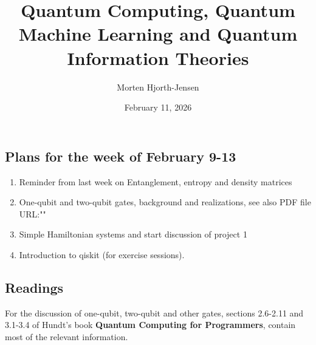 \documentclass[%
oneside,                 %
final,                   %
10pt]{article}
\begin{document}

\newcommand{\exercisesection}[1]{\subsection*{#1}}






\title{Quantum Computing, Quantum Machine Learning and Quantum Information Theories}


\author{Morten Hjorth-Jensen}

\date{February 11, 2026
}

\subsection{Plans for the week of February 9-13}

\begin{enumerate}
\item Reminder from last week on Entanglement, entropy and density matrices

\item One-qubit and two-qubit gates, background and realizations, see also PDF file URL:""

\item Simple Hamiltonian systems and start discussion of project 1

\item Introduction to qiskit (for exercise sessions).
\end{enumerate}

\noindent
\subsection{Readings}

For the discussion of one-qubit, two-qubit and other gates, sections
2.6-2.11 and 3.1-3.4 of Hundt's book \textbf{Quantum Computing for Programmers},
contain most of the relevant information.
\end{document}
